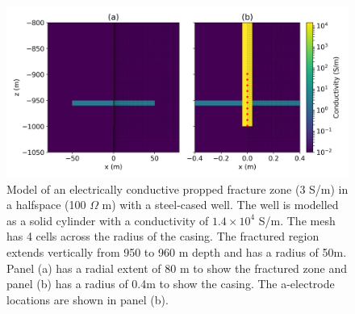 \begin{figure}
    \begin{center}
    \includegraphics[width=\textwidth]{figures/inversion/DC_cyl_setup.png}
    \end{center}
\caption{
    Model of an electrically conductive propped fracture zone (3 S/m) in a halfspace (100 $\Omega$ m) with a steel-cased well.
    The well is modelled as a solid cylinder with a conductivity of $1.4 \times 10^4$ S/m. The mesh has 4 cells across the
    radius of the casing. The fractured region extends vertically from 950 to 960 m depth and has a radius of 50m.
    Panel (a) has a radial extent of 80 m to show the fractured zone and panel (b) has a radius of 0.4m to show the casing.
    The a-electrode locations are shown in panel (b).
}
\label{fig:DC_cyl_setup}
\end{figure}
